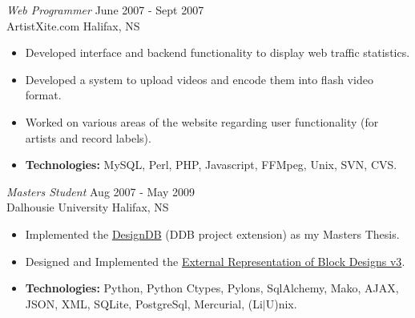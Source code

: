 \documentclass[line,margin]{res}
\begin{document}
\begin{resume}
   {\sl Web Programmer} \hfill June 2007 - Sept 2007 \\
    ArtistXite.com \hfill Halifax, NS \smallskip
    \begin{itemize}  \itemsep -2pt %
     \item Developed interface and backend functionality to display
               web traffic statistics.
     \item Developed a system to upload videos and encode them
                into flash video format.
     \item Worked on various areas of the website regarding user
               functionality (for artists and record labels).
     \item {\bf Technologies:}\hspace{4pt}
        MySQL, Perl, PHP, Javascript, FFMpeg, Unix, SVN, CVS.
    \end{itemize}

   {\sl Masters Student} \hfill Aug 2007 - May 2009 \\
     Dalhousie University \hfill Halifax, NS \smallskip
      \begin{itemize}  \itemsep -2pt %
       \item Implemented the
       \href{http://batman.cs.dal.ca/~peter/designdb/}{DesignDB} (DDB
       project extension) as my Masters Thesis.
       \item Designed and Implemented the
       \href{http://designtheory.org/library/extrep/}{External
       Representation of Block Designs v3}.
       \item {\bf Technologies:} \hspace{1pt}
        Python, Python Ctypes, Pylons, SqlAlchemy, Mako, AJAX, \newline
        \hspace*{72pt} JSON, XML, SQLite, PostgreSql, Mercurial,
        (Li$|$U)nix.
    \end{itemize}

\newpage
\opening
\addvspace{\sectionskip}



\end{resume}
\end{document}
